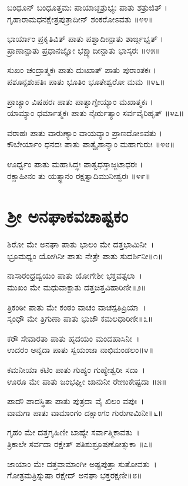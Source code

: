 ಬಂಧೂನ್ ಬಂಧೂತ್ತಮಃ ಪಾಯಾಚ್ಛತ್ರುಭ್ಯಃ ಪಾತು ಶತ್ರುಜಿತ್ ।\\
ಗೃಹಾರಾಮಧನಕ್ಷೇತ್ರಪುತ್ರಾದೀನ್ ಶಂಕರೋಽವತು ॥೪೪॥

ಭಾರ್ಯಾಂ ಪ್ರಕೃತಿವಿತ್ ಪಾತು ಪಶ್ವಾದೀನ್ಪಾತು ಶಾರ್ಙ್ಗಭೃತ್ ।\\
ಪ್ರಾಣಾನ್ಪಾತು ಪ್ರಧಾನಜ್ಞೋ ಭಕ್ಷ್ಯಾದೀನ್ಪಾತು ಭಾಸ್ಕರಃ ॥೪೫॥

ಸುಖಂ ಚಂದ್ರಾತ್ಮಕಃ ಪಾತು ದುಃಖಾತ್ ಪಾತು ಪುರಾಂತಕಃ ।\\
ಪಶೂನ್ಪಶುಪತಿಃ ಪಾತು ಭೂತಿಂ ಭೂತೇಶ್ವರೋ ಮಮ ॥೪೬॥

ಪ್ರಾಚ್ಯಾಂ ವಿಷಹರಃ ಪಾತು ಪಾತ್ವಾಗ್ನೇಯ್ಯಾಂ ಮಖಾತ್ಮಕಃ ।\\
ಯಾಮ್ಯಾಂ ಧರ್ಮಾತ್ಮಕಃ ಪಾತು ನೈರ್ಋತ್ಯಾಂ ಸರ್ವವೈರಿಹೃತ್ ॥೪೭॥

ವರಾಹಃ ಪಾತು ವಾರುಣ್ಯಾಂ ವಾಯವ್ಯಾಂ ಪ್ರಾಣದೋಽವತು ।\\
ಕೌಬೇರ್ಯಾಂ ಧನದಃ ಪಾತು ಪಾತ್ವೈಶಾನ್ಯಾಂ ಮಹಾಗುರುಃ ॥೪೮॥

ಊರ್ಧ್ವಂ ಪಾತು ಮಹಾಸಿದ್ಧಃ ಪಾತ್ವಧಸ್ತಾಜ್ಜಟಾಧರಃ ।\\
ರಕ್ಷಾಹೀನಂ ತು ಯತ್ಸ್ಥಾನಂ ರಕ್ಷತ್ವಾದಿಮುನೀಶ್ವರಃ ॥೪೯॥

\section{ ಶ್ರೀ ಅನಘಾಕವಚಾಷ್ಟಕಂ }
ಶಿರೋ ಮೇ ಅನಘಾ ಪಾತು ಭಾಲಂ ಮೇ ದತ್ತಭಾಮಿನೀ~।\\
ಭ್ರೂಮಧ್ಯಂ ಯೋಗಿನೀ ಪಾತು ನೇತ್ರೇ ಪಾತು ಸುದರ್ಶಿನೀ॥೧॥

ನಾಸಾರಂಧ್ರದ್ವಯಂ ಪಾತು ಯೋಗೇಶೀ ಭಕ್ತವತ್ಸಲಾ~।\\
ಮುಖಂ ಮೇ ಮಧುವಾಕ್ಪಾತು ದತ್ತಚಿತ್ತವಿಹಾರಿಣೀ॥೨॥

ತ್ರಿಕಂಠೀ ಪಾತು ಮೇ ಕಂಠಂ ವಾಚಂ ವಾಚಸ್ಪತಿಪ್ರಿಯಾ~।\\
ಸ್ಕಂಧೌ ಮೇ ತ್ರಿಗುಣಾ ಪಾತು ಭುಜೌ ಕಮಲಧಾರಿಣೀ॥೩॥

ಕರೌ ಸೇವಾರತಾ ಪಾತು ಹೃದಯಂ ಮಂದಹಾಸಿನೀ~।\\
ಉದರಂ ಅನ್ನದಾ ಪಾತು ಸ್ವಯಂಜಾ ನಾಭಿಮಂಡಲಂ॥೪॥

ಕಮನೀಯಾ ಕಟಿಂ ಪಾತು ಗುಹ್ಯಂ ಗುಹ್ಯೇಶ್ವರೀ ಸದಾ~।\\
ಊರೂ ಮೇ ಪಾತು ಜಂಭಘ್ನೀ ಜಾನುನೀ ರೇಣುಕೇಷ್ಟದಾ ॥೫॥
\newpage

ಪಾದೌ ಪಾದಸ್ಥಿತಾ ಪಾತು ಪುತ್ರದಾ ವೈ ಖಿಲಂ ವಪುಃ~।\\
ವಾಮಗಾ ಪಾತು ವಾಮಾಂಗಂ ದಕ್ಷಾಂಗಂ ಗುರುಗಾಮಿನೀ॥೬॥

ಗೃಹಂ ಮೇ ದತ್ತಗೃಹಿಣೀ ಬಾಹ್ಯೇ ಸರ್ವಾತ್ಮಿಕಾವತು~।\\
ತ್ರಿಕಾಲೇ ಸರ್ವದಾ ರಕ್ಷೇತ್ ಪತಿಶುಶ್ರೂಷಣೋತ್ಸುಕಾ ॥೭॥

ಜಾಯಾಂ ಮೇ ದತ್ತವಾಮಾಂಗೀ ಅಷ್ಟಪುತ್ರಾ ಸುತೋವತು~।\\
ಗೋತ್ರಮತ್ರಿಸ್ನುಷಾ ರಕ್ಷೇದ್ ಅನಘಾ ಭಕ್ತರಕ್ಷಣೀ॥೮॥

